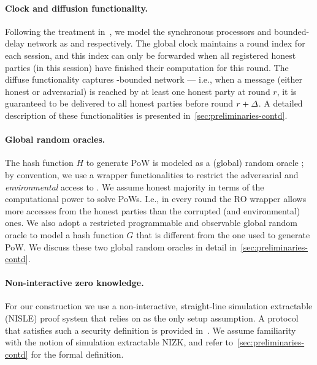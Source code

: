 \paragraph{Clock and diffusion functionality.}
%
Following the treatment in~\cite{C:BMTZ17}, we model the synchronous processors and bounded-delay network as \funcClock and \funcDiffuse respectively.
%
The global clock \funcClock maintains a round index for each session, and this index can only be forwarded when all registered honest parties (in this session) have finished their computation for this round.
%
The diffuse functionality \funcDiffuse captures \delay-bounded network --- i.e., when a message (either honest or adversarial) is reached by at least one honest party at round $r$, it is guaranteed to be delivered to all honest parties before round $r + \varDelta$.
%
A detailed description of these functionalities is presented in~\cref{sec:preliminaries-contd}.

\paragraph{Global random oracles.}
%
The hash function $H$ to generate PoW is modeled as a (global) random oracle \funcGRO; by convention, we use a wrapper functionalities \wrapper{\funcGRO} to restrict the adversarial and \emph{environmental} access to \funcGRO.
%
We assume honest majority in terms of the computational power to solve PoWs.
%
I.e., in every round the RO wrapper allows more accesses from the honest parties than the corrupted (and environmental) ones.
%
We also adopt a restricted programmable and observable global random oracle \funcGrpoRO \cite{EC:CDGLN18} to model a hash function $G$ that is different from the one used to generate PoW.
%
We discuss these two global random oracles in detail in~\cref{sec:preliminaries-contd}.

\paragraph{Non-interactive zero knowledge.}
%
For our construction we use a non-interactive, straight-line simulation extractable (NISLE) proof system that relies on \funcGrpoRO as the only setup assumption.
%
A protocol that satisfies such a security definition is provided  in~\cite{TCC:LysRos22}.
%
We assume familiarity with the notion of simulation extractable NIZK, and refer to~\cref{sec:preliminaries-contd} for the formal definition.

